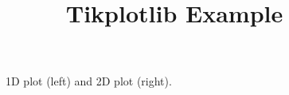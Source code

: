 \documentclass[a4paper,11pt]{article}
\title{\vspace{-10mm}Tikplotlib Example}
\begin{document}
\maketitle

\begin{figure}[h]
\begin{minipage}[b]{0.49\textwidth}
    
    \vspace{-1cm}
\end{minipage}
\hfill
\begin{minipage}[b]{0.49\textwidth}
    
    \vspace{-1cm}
\end{minipage}
\caption{1D plot (left) and 2D plot (right).}
\label{fig:example_plots}
\end{figure}
\end{document}
